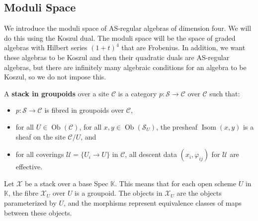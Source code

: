 \documentclass{amsart}
\def\HH{\operatorname{HH}}
\begin{document}




\subsection{Moduli Space}
We introduce the moduli space of AS-regular algebras of dimension four.  We will do this using the Koszul dual.  The moduli space will be the space of graded algebras with Hilbert series $(1+t)^4$ that are Frobenius.  In addition, we want these algebras to be Koszul and then their quadratic duals are AS-regular algebras, but there are infinitely many algebraic conditions for an algebra to be Koszul, so we do not impose this.

\begin{definition}
\textnormal{\cite[Tag 02ZI]{stacks-project} A \textbf{stack in groupoids} over a site $\mathcal{C}$ \cite[Tag 00VH]{stacks-project} is a category $p : \mathcal{S} \to \mathcal{C}$ over $\mathcal{C}$ such that:}
\begin{itemize}
    \item \textnormal{$p : \mathcal{S} \to \mathcal{C}$ is fibred in groupoids over $\mathcal{C}$,}
    \item \textnormal{for all $U \in \operatorname{Ob}(\mathcal{C})$, for all $x,y \in \operatorname{Ob}(\mathcal{S}_U)$, the presheaf $\operatorname{Isom}(x,y)$ is a sheaf on the site $\mathcal{C}/U$, and}
    \item \textnormal{for all coverings $\mathcal{U} = \{ U_i \to U \}$ in $\mathcal{C}$, all descent data $(x_i, \varphi_{ij})$ for $\mathcal{U}$ are effective.}
\end{itemize}
\end{definition}
Let \( \mathcal{X} \) be a stack over a base Spec $\mathbb{K}$. This means that for each open scheme $U$ in $\mathbb{K}$, the fibre \( \mathcal{X}_U \) over \( U \) is a groupoid. The objects in \( \mathcal{X}_U \) are the objects parameterized by \( U \), and the morphisms represent equivalence classes of maps between these objects.
\end{document}
